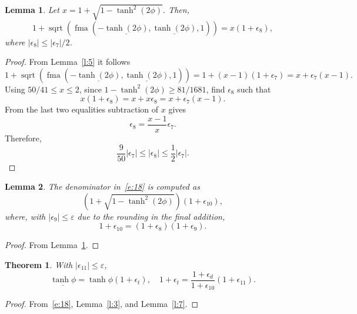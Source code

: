 \documentclass[a4paper,12pt,twoside]{article}
\newtheorem{thm}{Theorem}
\newtheorem{lem}{Lemma}
\begin{document}
\begin{lem}\label{l:6}
  Let $x=1+\sqrt{1-\tanh^2(2\phi)}$.  Then,
  \begin{displaymath}
    1+\mathop{\mathrm{sqrt}}(\mathop{\mathrm{fma}}(-\underline{\tanh(2\phi)},\underline{\tanh(2\phi)},1))=x(1+\epsilon_8),
  \end{displaymath}
  where $|\epsilon_8|\le|\epsilon_7|/2$.
\end{lem}
\begin{proof}
  From Lemma~\ref{l:5} it follows
  \begin{displaymath}
    1+\mathop{\mathrm{sqrt}}(\mathop{\mathrm{fma}}(-\underline{\tanh(2\phi)},\underline{\tanh(2\phi)},1))=1+(x-1)(1+\epsilon_7)=x+\epsilon_7(x-1).
  \end{displaymath}
  Using $50/41\le x\le 2$, since $1-\tanh^2(2\phi)\ge 81/1681$, find
  $\epsilon_8$ such that
  \begin{displaymath}
    x(1+\epsilon_8)=x+x\epsilon_8=x+\epsilon_7(x-1).
  \end{displaymath}
  From the last two equalities subtraction of $x$ gives
  \begin{displaymath}
    \epsilon_8=\frac{x-1}{x}\epsilon_7.
  \end{displaymath}
  Therefore,
  \begin{displaymath}
    \frac{9}{50}|\epsilon_7|\le|\epsilon_8|\le\frac{1}{2}|\epsilon_7|.
  \end{displaymath}
\end{proof}

\begin{lem}\label{l:7}
  The denominator in~\eqref{e:18} is computed as
  \begin{displaymath}
    (1+\sqrt{1-\tanh^2(2\phi)})(1+\epsilon_{10}),
  \end{displaymath}
  where, with $|\epsilon_9|\le\varepsilon$ due to the rounding in the
  final addition,
  \begin{displaymath}
    1+\epsilon_{10}=(1+\epsilon_8)(1+\epsilon_9).
  \end{displaymath}
\end{lem}
\begin{proof}
  From Lemma~\ref{l:6}.
\end{proof}

\begin{thm}\label{t:1}
  With $|\epsilon_{11}|\le\varepsilon$,
  \begin{equation}
    \underline{\tanh\phi}=\tanh\phi(1+\epsilon_t),\quad
    1+\epsilon_t=\frac{1+\epsilon_d}{1+\epsilon_{10}}(1+\epsilon_{11}).
    \label{e:23}
  \end{equation}
\end{thm}
\begin{proof}
  From~\eqref{e:18}, Lemma~\eqref{l:3}, and Lemma~\eqref{l:7}.
\end{proof}
\end{document}
